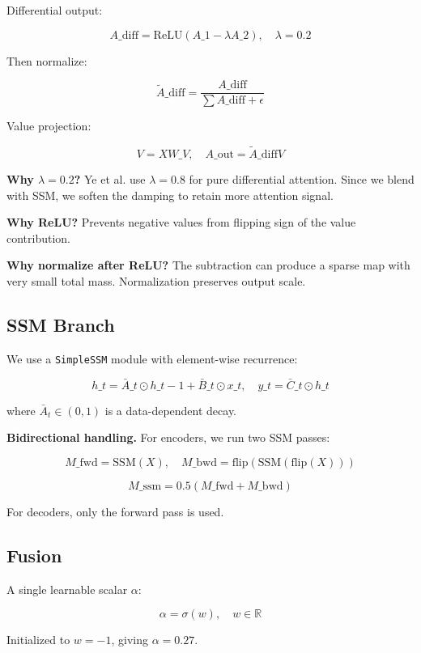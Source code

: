 Differential output:

\[
A\_\text{diff} = \text{ReLU}(A\_1 - \lambda A\_2), \quad \lambda = 0.2
\tag{4.4}
\]

Then normalize:

\[
\tilde{A}\_\text{diff} = \frac{A\_\text{diff}}{\sum A\_\text{diff} + \epsilon}
\tag{4.5}
\]

Value projection:

\[
V = X W\_V, \quad A\_\text{out} = \tilde{A}\_\text{diff} V
\tag{4.6}
\]

\textbf{Why $\lambda = 0.2$?} Ye et al. use $\lambda = 0.8$ for pure differential 
attention. Since we blend with SSM, we soften the damping to retain more 
attention signal.

\textbf{Why ReLU?} Prevents negative values from flipping sign of the value 
contribution.

\textbf{Why normalize after ReLU?} The subtraction can produce a sparse map with 
very small total mass. Normalization preserves output scale.

\subsection{SSM Branch}

We use a \texttt{SimpleSSM} module with element-wise recurrence:

\[
h\_t = \bar{A}\_t \odot h\_{t-1} + \bar{B}\_t \odot x\_t, \quad
y\_t = \bar{C}\_t \odot h\_t
\tag{4.7}
\]

where $\bar{A}_t \in (0, 1)$ is a data-dependent decay.

\textbf{Bidirectional handling.} For encoders, we run two SSM passes:

\[
M\_\text{fwd} = \text{SSM}(X), \quad
M\_\text{bwd} = \text{flip}(\text{SSM}(\text{flip}(X)))
\tag{4.8}
\]

\[
M\_\text{ssm} = 0.5 (M\_\text{fwd} + M\_\text{bwd})
\tag{4.9}
\]

For decoders, only the forward pass is used.

\subsection{Fusion}

A single learnable scalar $\alpha$:

\[
\alpha = \sigma(w), \quad w \in \mathbb{R}
\tag{4.10}
\]

Initialized to $w = -1$, giving $\alpha = 0.27$.

